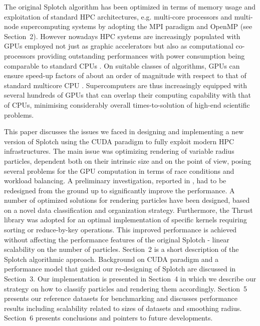 \documentclass[1p]{elsarticle}
\begin{document}

The original Splotch algorithm has been optimized in terms of memory usage and exploitation of standard HPC architectures, e.g. multi-core processors and multi-node supercomputing systems by adopting the MPI paradigm \cite{jin:high-performance} and OpenMP (see Section~2). However nowadays HPC systems are increasingly populated with GPUs employed not just as graphic accelerators but also as computational co-processors providing outstanding performances with power consumption being comparable to standard CPUs \cite{}. On suitable classes of algorithms, GPUs can ensure speed-up factors of about an order of magnitude with respect to that of standard multicore CPU \cite{}. Supercomputers are thus increasingly equipped with several hundreds of GPUs that can overlap their computing capability with that of CPUs, minimising considerably overall times-to-solution of high-end scientific problems.

This paper discusses the issues we faced in designing and implementing a new version of Splotch using the CUDA paradigm to fully exploit modern HPC infrastructures. The main issue was optimizing rendering of variable radius particles, dependent both on their intrinsic size and on the point of view, posing several problems for the GPU computation in terms of race conditions and workload balancing. A preliminary investigation, reported in \cite{jin:high-performance}, had to be redesigned from the ground up to significantly improve the performance. A number of optimized solutions for rendering particles have been designed, based on a novel data classification and organization strategy. Furthermore, the Thrust library \cite{thrusturl} was adopted for an optimal implementation of specific kernels requiring sorting or reduce-by-key operations.
This improved performance is achieved without affecting the performance features of the original Splotch - linear scalability on the number of particles. 
Section~2 is a short description of the Splotch algorithmic approach. Background on CUDA paradigm and a performance model that guided our re-designing of Splotch are discussed in Section~3. Our implementation is presented in Section~4 in which we describe our strategy on how to classify particles and rendering them accordingly. Section~5 presents our reference datasets for benchmarking and discusses performance results including scalability related to sizes of datasets and smoothing radius. Section~6 presents conclusions and pointers to future developments.
\end{document}

